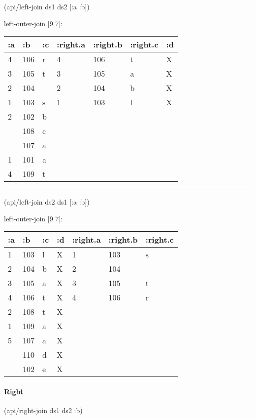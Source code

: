 \documentclass[]{article}
\newenvironment{Shaded}{\begin{snugshade}}{\end{snugshade}}
\newcommand{\AttributeTok}[1]{\textcolor[rgb]{0.77,0.63,0.00}{#1}}
\newcommand{\NormalTok}[1]{#1}
\let\oldparagraph\paragraph
\renewcommand{\paragraph}[1]{\oldparagraph{#1}\mbox{}}
\begin{document}
\begin{Shaded}
\begin{Highlighting}[]
\NormalTok{(api/left-join ds1 ds2 [}\AttributeTok{:a} \AttributeTok{:b}\NormalTok{])}
\end{Highlighting}
\end{Shaded}

left-outer-join {[}9 7{]}:

\begin{longtable}[]{@{}lllllll@{}}
\toprule
:a & :b & :c & :right.a & :right.b & :right.c & :d\tabularnewline
\midrule
\endhead
4 & 106 & r & 4 & 106 & t & X\tabularnewline
3 & 105 & t & 3 & 105 & a & X\tabularnewline
2 & 104 & & 2 & 104 & b & X\tabularnewline
1 & 103 & s & 1 & 103 & l & X\tabularnewline
2 & 102 & b & & & &\tabularnewline
& 108 & c & & & &\tabularnewline
& 107 & a & & & &\tabularnewline
1 & 101 & a & & & &\tabularnewline
4 & 109 & t & & & &\tabularnewline
\bottomrule
\end{longtable}

\begin{center}\rule{0.5\linewidth}{0.5pt}\end{center}

\begin{Shaded}
\begin{Highlighting}[]
\NormalTok{(api/left-join ds2 ds1 [}\AttributeTok{:a} \AttributeTok{:b}\NormalTok{])}
\end{Highlighting}
\end{Shaded}

left-outer-join {[}9 7{]}:

\begin{longtable}[]{@{}lllllll@{}}
\toprule
:a & :b & :c & :d & :right.a & :right.b & :right.c\tabularnewline
\midrule
\endhead
1 & 103 & l & X & 1 & 103 & s\tabularnewline
2 & 104 & b & X & 2 & 104 &\tabularnewline
3 & 105 & a & X & 3 & 105 & t\tabularnewline
4 & 106 & t & X & 4 & 106 & r\tabularnewline
2 & 108 & t & X & & &\tabularnewline
1 & 109 & a & X & & &\tabularnewline
5 & 107 & a & X & & &\tabularnewline
& 110 & d & X & & &\tabularnewline
& 102 & e & X & & &\tabularnewline
\bottomrule
\end{longtable}

\paragraph{Right}\label{right}

\begin{Shaded}
\begin{Highlighting}[]
\NormalTok{(api/right-join ds1 ds2 }\AttributeTok{:b}\NormalTok{)}
\end{Highlighting}
\end{Shaded}
\end{document}
